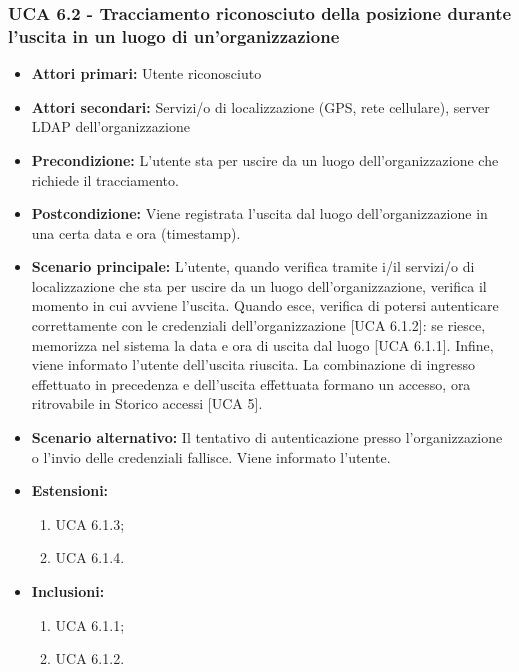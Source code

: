\subsubsection{UCA 6.2 - Tracciamento riconosciuto della posizione durante l'uscita in un luogo di un'organizzazione}
\begin{itemize}
	\item \textbf{Attori primari:} Utente riconosciuto
	\item \textbf{Attori secondari:} Servizi/o di localizzazione (GPS, rete cellulare), server LDAP dell'organizzazione
	\item \textbf{Precondizione:} L'utente sta per uscire da un luogo dell'organizzazione che richiede il tracciamento.
	\item \textbf{Postcondizione:} Viene registrata l'uscita dal luogo dell'organizzazione in una certa data e ora (timestamp).
	\item \textbf{Scenario principale:} L'utente, quando verifica tramite i/il servizi/o di localizzazione che sta per uscire da un luogo dell'organizzazione, verifica il momento in cui avviene l'uscita. Quando esce, verifica di potersi autenticare correttamente con le credenziali dell'organizzazione [UCA 6.1.2]: se riesce, memorizza nel sistema la data e ora di uscita dal luogo [UCA 6.1.1]. Infine, viene informato l'utente dell'uscita riuscita. La combinazione di ingresso effettuato in precedenza e dell'uscita effettuata formano un accesso, ora ritrovabile in Storico accessi [UCA 5].
	\item \textbf{Scenario alternativo:} Il tentativo di autenticazione presso l'organizzazione o l'invio delle credenziali fallisce. Viene informato l'utente.
	\item \textbf{Estensioni:}
	\begin{enumerate}
		\item UCA 6.1.3;
		\item UCA 6.1.4.
	\end{enumerate}
	\item \textbf{Inclusioni:}
	\begin{enumerate}
		\item UCA 6.1.1;
		\item UCA 6.1.2.
	\end{enumerate}
\end{itemize}

